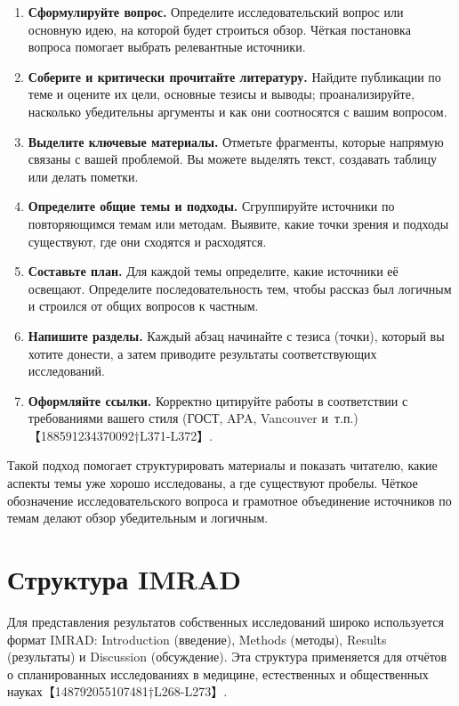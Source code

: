 \documentclass[
  russian,
  letterpaper,
]{book}
\providecommand{\tightlist}{%
  \setlength{\itemsep}{0pt}\setlength{\parskip}{0pt}}
\begin{document}
\begin{enumerate}
\def\labelenumi{\arabic{enumi}.}
\tightlist
\item
  \textbf{Сформулируйте вопрос.} Определите исследовательский вопрос или
  основную идею, на которой будет строиться обзор. Чёткая постановка
  вопроса помогает выбрать релевантные источники.
\item
  \textbf{Соберите и критически прочитайте литературу.} Найдите
  публикации по теме и оцените их цели, основные тезисы и выводы;
  проанализируйте, насколько убедительны аргументы и как они соотносятся
  с вашим вопросом.
\item
  \textbf{Выделите ключевые материалы.} Отметьте фрагменты, которые
  напрямую связаны с вашей проблемой. Вы можете выделять текст,
  создавать таблицу или делать пометки.
\item
  \textbf{Определите общие темы и подходы.} Сгруппируйте источники по
  повторяющимся темам или методам. Выявите, какие точки зрения и подходы
  существуют, где они сходятся и расходятся.
\item
  \textbf{Составьте план.} Для каждой темы определите, какие источники
  её освещают. Определите последовательность тем, чтобы рассказ был
  логичным и строился от общих вопросов к частным.
\item
  \textbf{Напишите разделы.} Каждый абзац начинайте с тезиса (точки),
  который вы хотите донести, а затем приводите результаты
  соответствующих исследований.
\item
  \textbf{Оформляйте ссылки.} Корректно цитируйте работы в соответствии
  с требованиями вашего стиля (ГОСТ, APA, Vancouver
  и~т.п.)【188591234370092†L371-L372】.
\end{enumerate}

Такой подход помогает структурировать материалы и показать читателю,
какие аспекты темы уже хорошо исследованы, а где существуют пробелы.
Чёткое обозначение исследовательского вопроса и грамотное объединение
источников по темам делают обзор убедительным и логичным.

\chapter{Структура
IMRAD}\label{ux441ux442ux440ux443ux43aux442ux443ux440ux430-imrad}

Для представления результатов собственных исследований широко
используется формат IMRAD: Introduction (введение), Methods (методы),
Results (результаты) и Discussion (обсуждение). Эта структура
применяется для отчётов о спланированных исследованиях в медицине,
естественных и общественных науках【148792055107481†L268-L273】.
\end{document}
